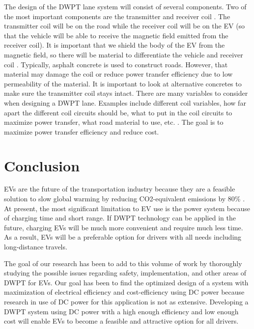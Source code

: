 The design of the DWPT lane system will consist of several components. Two of the most important components are 
the transmitter and receiver coil \cite{throngnumchai_design_2013}. The transmitter coil will be on the road while 
the receiver coil will be on the EV (so that the vehicle will be able to receive the magnetic field emitted 
from the receiver coil). It is important that we shield the body of the EV from the magnetic field, so there 
will be material to differentiate the vehicle and receiver coil \cite{throngnumchai_design_2013}. Typically, asphalt 
concrete is used to construct roads. However, that material may damage the coil or reduce power transfer efficiency 
due to low permeability of the material. It is important to look at alternative concretes to make sure the transmitter 
coil stays intact. There are many variables to consider when designing a DWPT lane. Examples include different coil 
variables, how far apart the different coil circuits should be, what to put in the coil circuits to maximize power 
transfer, what road material to use, etc. \cite{panchal_review_2018}. The goal is to maximize power transfer 
efficiency and reduce cost.

\section{Conclusion}
EVs are the future of the transportation industry because they are a feasible solution to slow global warming by 
reducing CO2-equivalent emissions by 80\% \cite{helmers_electric_2012}. At present, the most significant limitation to 
EV use is the power system because of charging time and short range. If DWPT technology can be applied in the future, 
charging EVs will be much more convenient and require much less time. As a result, EVs will be a preferable option 
for drivers with all needs including long-distance travels.

The goal of our research has been to add to this volume of work by thoroughly studying the possible issues regarding 
safety, implementation, and other areas of DWPT for EVs. Our goal has been to find the optimized design of a system 
with maximization of electrical efficiency and cost-efficiency using DC power because research in use of DC power 
for this application is not as extensive. Developing a DWPT system using DC power with a high enough efficiency and 
low enough cost will enable EVs to become a feasible and attractive option for all drivers. 